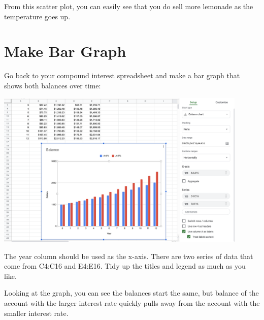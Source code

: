 From this scatter plot, you can easily see that you do sell more
lemonade as the temperature goes up.


\section{Make Bar Graph}

Go back to your compound interest spreadsheet and make a bar graph
that shows both balances over time:

\includegraphics[width=0.9\textwidth]{InterestGraph.png}

The year column should be used as the x-axis. There are two series of
data that come from C4:C16 and E4:E16.  Tidy up the titles and legend
as much as you like.

Looking at the graph, you can see the balances start the same, but
balance of the account with the larger interest rate quickly pulls
away from the account with the smaller interest rate.


